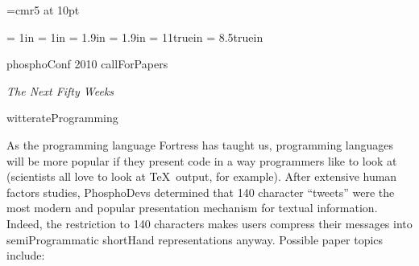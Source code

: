 


\font\titlefont=cmr5 at 10pt

\def\section#1\par{\bigskip{}\nobreak\par\noindent}

\let\footnote = \numberedfootnote

\topmargin = 1in
\bottommargin = 1in
\leftmargin = 1.9in
\rightmargin = 1.9in
\paperheight = 11truein
\paperwidth = 8.5truein

\hyphenchar{}
{\tt \hyphenchar{}}
{\it \hyphenchar{}}
{\titlefont \hyphenchar{}} %

\def\bull#1{\medskip\hbox{\vtop{\hsize12pt{$\bullet$\hfil}}
\vtop{\hsize4.5in{#1}}\hfil}}

\centerline{\titlefont phosphoConf 2010 callForPapers}
\smallskip
\centerline{{\it The Next Fifty Weeks}}


\section twitterateProgramming

As the programming language Fortress has taught us, programming
languages will be more popular if they present code in a way
programmers like to look at (scientists all love to look at
\TeX\ output, for example).  After extensive human factors studies,
PhosphoDevs determined that 140 character ``tweets'' were the most
modern and popular presentation mechanism for textual information.
Indeed, the restriction to 140 characters makes users compress their
messages into semiProgrammatic shortHand representations anyway.
Possible paper topics include:

